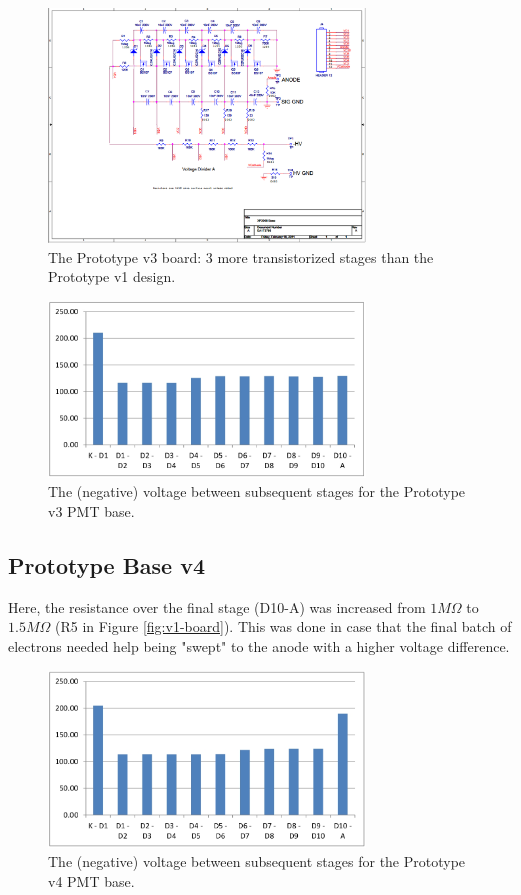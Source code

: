 \begin{figure}[h]
	\centerline{
		\mbox{\includegraphics[width=0.75\textwidth]{figures/newbase_6mosfet.png}}
	}
	\caption{The Prototype v3 board: 3 more transistorized stages than the Prototype v1 design.}
	\label{fig:v3-board}
\end{figure}

\begin{figure}[h]
	\centerline{
		\mbox{\includegraphics[width=0.75\textwidth]{figures/v3-volt.jpg}}
	}
	\caption{The (negative) voltage between subsequent stages for the Prototype v3 PMT base.}
	\label{fig:v3-volt}
\end{figure}
\newpage
\subsection{Prototype Base v4}

Here, the resistance over the final stage (D10-A) was increased from $1M\Omega$ to $1.5M\Omega$ (R5 in Figure \ref{fig:v1-board}). This was done in case that the final batch of electrons needed help being "swept" to the anode with a higher voltage difference.

\begin{figure}[h]
	\centerline{
		\mbox{\includegraphics[width=0.75\textwidth]{figures/v4-volt.jpg}}
	}
	\caption{The (negative) voltage between subsequent stages for the Prototype v4 PMT base.}
	\label{fig:v4-volt}
\end{figure}
\newpage


